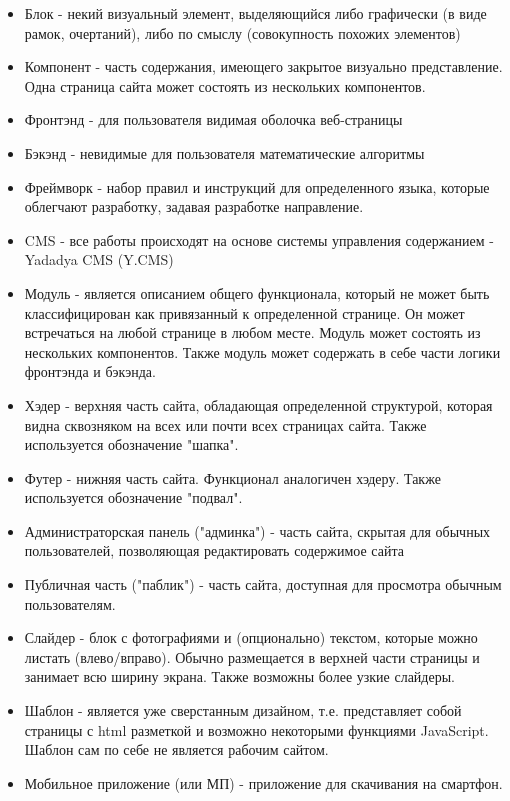 \documentclass[DIV=calc, paper=a4, fontsize=11pt]{scrartcl} %
\begin{document}
        \begin{itemize}
        \item Блок - некий визуальный элемент, выделяющийся либо графически (в виде рамок, очертаний), либо по смыслу (совокупность похожих элементов)
        \item Компонент - часть содержания, имеющего закрытое визуально представление. Одна страница сайта может состоять из нескольких компонентов.
        \item Фронтэнд - для пользователя видимая оболочка веб-страницы
        \item Бэкэнд - невидимые для пользователя математические алгоритмы
        \item Фреймворк - набор правил и инструкций для определенного языка, которые облегчают разработку, задавая разработке направление.
        \item CMS - все работы происходят на основе системы управления содержанием - Yadadya CMS (Y.CMS)
        \item Модуль - является описанием общего функционала, который не может быть классифицирован как привязанный к определенной странице. Он может встречаться на любой странице в любом месте. Модуль может состоять из нескольких компонентов. Также модуль может содержать в себе части логики фронтэнда и бэкэнда.
        \item Хэдер - верхняя часть сайта, обладающая определенной структурой, которая видна сквозняком на всех или почти всех страницах сайта. Также используется обозначение "шапка".
        \item Футер - нижняя часть сайта. Функционал аналогичен хэдеру. Также используется обозначение "подвал".
        \item Администраторская панель ("админка") - часть сайта, скрытая для обычных пользователей, позволяющая редактировать содержимое сайта
        \item Публичная часть ("паблик") - часть сайта, доступная для просмотра обычным пользователям.
        \item Слайдер - блок с фотографиями и (опционально) текстом, которые можно листать (влево/вправо). Обычно размещается в верхней части страницы и занимает всю ширину экрана. Также возможны более узкие слайдеры.
        \item Шаблон - является уже сверстанным дизайном, т.е. представляет собой страницы с html разметкой и возможно некоторыми функциями JavaScript. Шаблон сам по себе не является рабочим сайтом.
        \item Мобильное приложение (или МП) - приложение для скачивания на смартфон. 

    \end{itemize}
    
\end{document}
